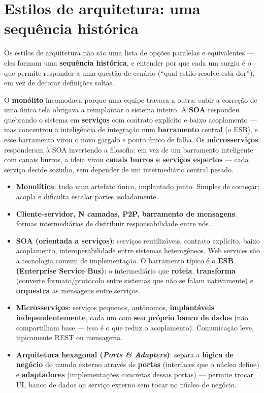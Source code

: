 \section{Estilos de arquitetura: uma sequência histórica}

\begin{conceito}
Os estilos de arquitetura não são uma lista de opções paralelas e
equivalentes --- eles formam uma \textbf{sequência histórica}, e entender
por que cada um surgiu é o que permite responder a uma questão de cenário
(“qual estilo resolve esta dor”), em vez de decorar definições soltas.

O \textbf{monólito} incomodava porque uma equipe travava a outra: subir a
correção de uma única tela obrigava a reimplantar o sistema inteiro. A
\textbf{SOA} respondeu quebrando o sistema em \textbf{serviços} com
contrato explícito e baixo acoplamento --- mas concentrou a inteligência de
integração num \textbf{barramento} central (o ESB), e esse barramento
virou o novo gargalo e ponto único de falha. Os \textbf{microsserviços}
responderam à SOA invertendo a filosofia: em vez de um barramento
inteligente com canais burros, a ideia virou \textbf{canais burros e
serviços espertos} --- cada serviço decide sozinho, sem depender de um
intermediário central pesado.

\begin{itemize}
\item \textbf{Monolítica}: tudo num artefato único, implantado junto.
Simples de começar; acopla e dificulta escalar partes isoladamente.
\item \textbf{Cliente-servidor, N camadas, P2P, barramento de mensagens}:
formas intermediárias de distribuir responsabilidade entre nós.
\item \textbf{SOA (orientada a serviços)}: serviços reutilizáveis, contrato
explícito, baixo acoplamento, interoperabilidade entre sistemas
heterogêneos. Web services são a tecnologia comum de implementação. O
barramento típico é o \textbf{ESB (Enterprise Service Bus)}: o
intermediário que \textbf{roteia}, \textbf{transforma} (converte
formato/protocolo entre sistemas que não se falam nativamente) e
\textbf{orquestra} as mensagens entre serviços.
\item \textbf{Microsserviços}: serviços pequenos, autônomos,
\textbf{implantáveis independentemente}, cada um com \textbf{seu próprio
banco de dados} (não compartilham base --- isso é o que reduz o
acoplamento). Comunicação leve, tipicamente REST ou mensageria.
\item \textbf{Arquitetura hexagonal (\textit{Ports \& Adapters})}: separa a
\textbf{lógica de negócio} do mundo externo através de \textbf{portas}
(interfaces que o núcleo define) e \textbf{adaptadores} (implementações
concretas dessas portas) --- permite trocar UI, banco de dados ou serviço
externo sem tocar no núcleo de negócio.
\end{itemize}
\end{conceito}

